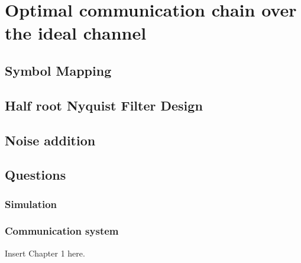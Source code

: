 \section{Optimal communication chain over the ideal channel}
\subsection{Symbol Mapping}
\subsection{Half root Nyquist Filter Design}
\subsection{Noise addition}
\subsection{Questions}
\subsubsection{Simulation}
\subsubsection{Communication system}

Insert Chapter 1 here.